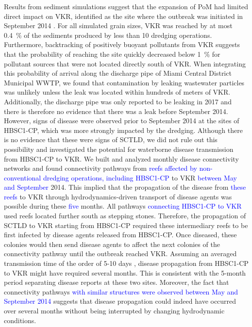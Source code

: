 \documentclass[preprint,12pt,authoryear]{elsarticle}
\newcommand{\modif}[1]{\textcolor{blue}{#1}}
\begin{document}
Results from sediment simulations suggest that the expansion of PoM had limited direct impact on VKR, identified as the site where the outbreak was initiated in September 2014 \citep{precht2016unprecedented}. For all simulated grain sizes, VKR was reached by at most 0.4~\% of the sediments produced by less than 10 dredging operations. Furthermore, backtracking of positively buoyant pollutants from VKR suggests that the probability of reaching the site quickly decreased below 1~\% for pollutant sources that were not located directly south of VKR. When integrating this probability of arrival along the discharge pipe of Miami Central District Municipal WWTP, we found that contamination by leaking wastewater particles was unlikely unless the leak was located within hundreds of meters of VKR. Additionally, the discharge pipe was only reported to be leaking in 2017 \citep{staletovich2017} and there is therefore no evidence that there was a leak before September 2014. However, signs of disease were observed prior to September 2014 at the sites of HBSC1-CP, which was more strongly impacted by the dredging. Although there is no evidence that these were signs of SCTLD, we did not rule out this possibility and investigated the potential for waterborne disease transmission from HBSC1-CP to VKR. We built and analyzed monthly disease connectivity networks and found connectivity pathways from \modif{reefs affected by non-conventional dredging operations, including HBSC1-CP} to VKR \modif{between May and September} 2014. This implied that the propagation of the disease from \modif{these reefs} to VKR through hydrodynamics-driven transport of disease agents was possible during these \modif{five} months. All pathways \modif{connecting HBSC1-CP to VKR}  used reefs located further south as stepping stones. Therefore, the propagation of SCTLD to VKR starting from HBSC1-CP required these intermediary reefs to be first infected by disease agents released from HBSC1-CP. Once diseased, these colonies would then send disease agents to affect the next colonies of the connectivity pathway until the outbreak reached VKR. Assuming an averaged transmission time of the order of 5-10 days \citep{dobbelaere2020coupled}, disease propagation from HBSC1-CP to VKR might have required several months. This is consistent with the 5-month period separating disease reports at these two sites. Moreover, the fact that connectivity pathways \modif{with similar structures were observed between May and September 2014} suggests that disease propagation could indeed have occurred over several months without being interrupted by changing hydrodynamic conditions.
\end{document}
